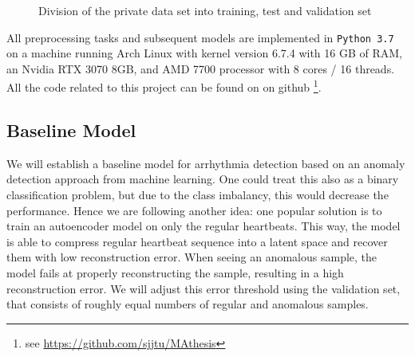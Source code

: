 \begin{figure}[H] \label{fig:tree_test-trainval}
    \centering
    \caption{Division of the private data set into training, test and validation set}
\end{figure}


All preprocessing tasks and subsequent models are implemented in \texttt{Python 3.7} on a machine running Arch Linux with kernel version 6.7.4 with 16 GB of RAM, an Nvidia RTX 3070 8GB, and AMD 7700 processor with 8 cores / 16 threads. All the code related to this project can be found on on github \footnote{see \href{https://github.com/sjjtu/MAthesis}{https://github.com/sjjtu/MAthesis}}.

\subsection{Baseline Model}
We will establish a baseline model for arrhythmia detection based on an anomaly detection approach from machine learning. One could treat this also as a binary classification problem, but due to the class imbalancy, this would decrease the performance. Hence we are following another idea: one popular solution is to train an autoencoder model on only the regular heartbeats. This way, the model is able to compress regular heartbeat sequence into a latent space and recover them with low reconstruction error. When seeing an anomalous sample, the model fails at properly reconstructing the sample, resulting in a high reconstruction error. We will adjust this error threshold using the validation set, that consists of roughly equal numbers of regular and anomalous samples.

